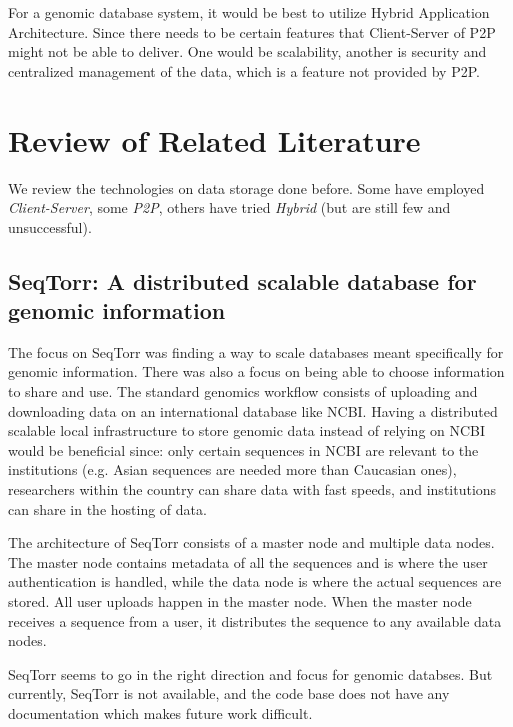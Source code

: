 \documentclass[acmsmall]{acmart}
\begin{document}
For a genomic database system, it would be best to utilize Hybrid Application Architecture. Since there needs to be certain features that Client-Server of P2P might not be able to deliver. One would be scalability, another is security and centralized management of the data, which is a feature not provided by P2P.


\section{Review of Related Literature}

We review the technologies on data storage done before. Some have employed \textit{Client-Server}, some \textit{P2P}, others have tried \textit{Hybrid} (but are still few and unsuccessful).

\subsection{SeqTorr: A distributed scalable database for genomic information}
The focus on SeqTorr was finding a way to scale databases meant specifically for genomic information. There was also a focus on being able to choose information to share and use. The standard genomics workflow consists of uploading and downloading data on an international database like NCBI. Having a distributed scalable local infrastructure to store genomic data instead of relying on NCBI would be beneficial since: only certain sequences in NCBI are relevant to the institutions (e.g. Asian sequences are needed more than Caucasian ones), researchers within the country can share data with fast speeds, and  institutions can share in the hosting of data.

The architecture of SeqTorr consists of a master node and multiple data nodes. The master node contains metadata of all the sequences and is where the user authentication is handled, while the data node is where the actual sequences are stored. All user uploads happen in the master node. When the master node receives a sequence from a user, it distributes the sequence to any available data nodes. 
\cite{seqtorr}

SeqTorr seems to go in the right direction and focus for genomic databses. But currently, SeqTorr is not available, and the code base does not have any documentation which makes future work difficult.
\end{document}
